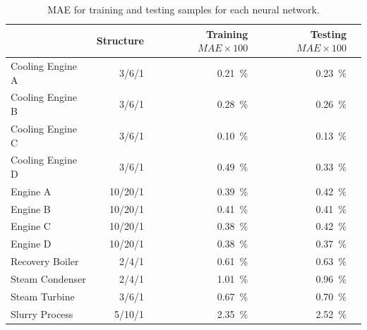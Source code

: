 \begin{table}[!t]
\caption{MAE for training and testing samples for each neural network.}
\label{tbl:mae}
  \centering
\begin{tabular}{lrrrr} \toprule
 & Structure  & Training $MAE \times 100$ & Testing $MAE \times100$ \\ \midrule
Cooling Engine A & 3/6/1 & \SI{0.21}{\percent} & \SI{0.23}{\percent} \\
Cooling Engine B & 3/6/1  & \SI{0.28}{\percent} & \SI{0.26}{\percent} \\
Cooling Engine C & 3/6/1  & \SI{0.10}{\percent} & \SI{0.13}{\percent} \\
Cooling Engine D & 3/6/1  & \SI{0.49}{\percent} & \SI{0.33}{\percent} \\
 Engine A & 10/20/1  & \SI{0.39}{\percent} & \SI{0.42}{\percent} \\
 Engine B & 10/20/1  & \SI{0.41}{\percent} & \SI{0.41}{\percent} \\
 Engine C & 10/20/1  & \SI{0.38}{\percent} & \SI{0.42}{\percent} \\
 Engine D & 10/20/1  & \SI{0.38}{\percent} & \SI{0.37}{\percent} \\
 Recovery Boiler & 2/4/1  & \SI{0.61}{\percent} & \SI{0.63}{\percent} \\
 Steam Condenser & 2/4/1  & \SI{1.01}{\percent} & \SI{0.96}{\percent} \\
 Steam Turbine & 3/6/1  & \SI{0.67}{\percent} & \SI{0.70}{\percent} \\
 Slurry Process & 5/10/1  & \SI{2.35}{\percent} & \SI{2.52}{\percent} \\
 \bottomrule
\end{tabular}
\vspace{-0.3cm}

\end{table}

